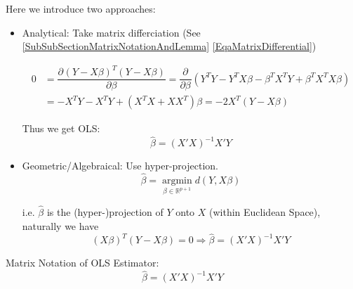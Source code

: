     Here we introduce two approaches:
\begin{itemize}[topsep=2pt,itemsep=2pt]
    \item Analytical: Take matrix differciation (See \autoref{SubSubSectionMatrixNotationAndLemma} \autoref{EqaMatrixDifferential})
    
   

\begin{align*}
    0&=\dfrac{\partial^{} (Y-X\beta )^T(Y-X\beta ) }{\partial \beta ^{}} =\dfrac{\partial^{} }{\partial\beta  ^{}}(Y^TY- Y^TX\beta -\beta ^TX^TY+\beta ^TX^TX\beta )\\ 
    &=-X^TY-X^TY+(X^TX+XX^T)\beta 
    =-2X^T(Y-X\beta )
\end{align*}
    
    Thus we get OLS:
    \begin{equation}
        \hat{\beta }=(X'X)^{-1}X'Y 
    \end{equation}
    
    
    \item Geometric/Algebraical: Use hyper-projection.
    \begin{equation}
        \hat{\beta }=\mathop{ \arg\min }\limits_{\beta \in \mathbb{R}^{p+1} } d(Y,X\beta )
    \end{equation}

    i.e. $ \hat{\beta } $ is the (hyper-)projection of $ Y $ onto $ X $ (within Euclidean Space), naturally we have
    \begin{equation}
        (X\beta )^T(Y-X\beta )=0\Rightarrow \hat{\beta }=(X'X)^{-1}X'Y 
    \end{equation}

\end{itemize}

\begin{point}
    Matrix Notation of OLS Estimator:
    \begin{equation}
        \hat{\beta }=(X'X)^{-1}X'Y 
    \end{equation}
\end{point}



